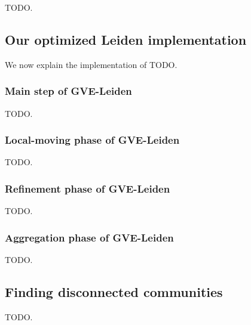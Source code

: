 TODO.

% 
% 
% 




\subsection{Our optimized Leiden implementation}

We now explain the implementation of TODO.


\subsubsection{Main step of GVE-Leiden}

TODO.






\subsubsection{Local-moving phase of GVE-Leiden}

TODO.


\subsubsection{Refinement phase of GVE-Leiden}

TODO.


\subsubsection{Aggregation phase of GVE-Leiden}

TODO.




\subsection{Finding disconnected communities}

TODO.
